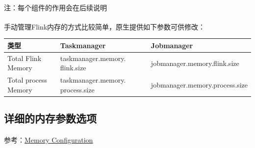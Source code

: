 \documentclass[UTF8]{ctexart}
\begin{document}
    \paragraph*{}
    注：每个组件的作用会在后续说明
    \newpage

    \paragraph*{}
    手动管理Flink内存的方式比较简单，原生提供如下参数可供修改：\\
    \newline
    \begin{minipage}[b]{1\linewidth}
        \centering
        \begin{tabular}{|l|l|l|}
            \hline
            类型&Taskmanager&Jobmanager\\
            \hline
            Total Flink Memory&taskmanager.memory. flink.size&jobmanager.memory.flink.size\\
            \hline
            Total process Memory&taskmanager.memory. process.size&jobmanager.memory.process.size\\
            \hline
        \end{tabular}
    \end{minipage}

    \subsection*{详细的内存参数选项}
    \paragraph*{}
    参考：\href{https://nightlies.apache.org/flink/flink-docs-release-1.14/docs/deployment/config/#memory-configuration}{Memory Configuration}
\end{document}
